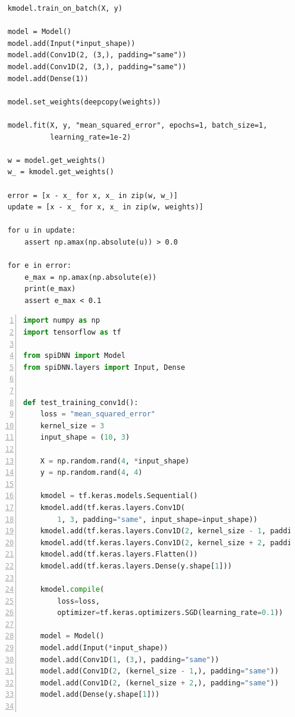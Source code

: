 \documentclass[]{article}
\begin{document}
\begin{appendices}
\begin{lstlisting}
    kmodel.train_on_batch(X, y)

    model = Model()
    model.add(Input(*input_shape))
    model.add(Conv1D(2, (3,), padding="same"))
    model.add(Conv1D(2, (3,), padding="same"))
    model.add(Dense(1))

    model.set_weights(deepcopy(weights))

    model.fit(X, y, "mean_squared_error", epochs=1, batch_size=1,
              learning_rate=1e-2)

    w = model.get_weights()
    w_ = kmodel.get_weights()

    error = [x - x_ for x, x_ in zip(w, w_)]
    update = [x - x_ for x, x_ in zip(w, weights)]

    for u in update:
        assert np.amax(np.absolute(u)) > 0.0

    for e in error:
        e_max = np.amax(np.absolute(e))
        print(e_max)
        assert e_max < 0.1
\end{lstlisting}

\newpage

\begin{lstlisting}[language=Python, caption={Excerpt from the test
  suite showing the biggest \acrshort{cnn} trained with the prototye, without
  dropped packets.}, captionpos=b, numbers=left,
  label={lst:training_cnn}]
import numpy as np
import tensorflow as tf

from spiDNN import Model
from spiDNN.layers import Input, Dense


def test_training_conv1d():
    loss = "mean_squared_error"
    kernel_size = 3
    input_shape = (10, 3)

    X = np.random.rand(4, *input_shape)
    y = np.random.rand(4, 4)

    kmodel = tf.keras.models.Sequential()
    kmodel.add(tf.keras.layers.Conv1D(
        1, 3, padding="same", input_shape=input_shape))
    kmodel.add(tf.keras.layers.Conv1D(2, kernel_size - 1, padding="same"))
    kmodel.add(tf.keras.layers.Conv1D(2, kernel_size + 2, padding="same"))
    kmodel.add(tf.keras.layers.Flatten())
    kmodel.add(tf.keras.layers.Dense(y.shape[1]))

    kmodel.compile(
        loss=loss,
        optimizer=tf.keras.optimizers.SGD(learning_rate=0.1))

    model = Model()
    model.add(Input(*input_shape))
    model.add(Conv1D(1, (3,), padding="same"))
    model.add(Conv1D(2, (kernel_size - 1,), padding="same"))
    model.add(Conv1D(2, (kernel_size + 2,), padding="same"))
    model.add(Dense(y.shape[1]))


\end{lstlisting}
\end{appendices}
\end{document}
